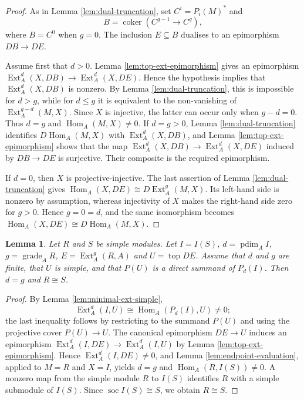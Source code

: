 \documentclass[a4paper]{amsart}
\newtheorem{lemma}[theorem]{Lemma}
\theoremstyle{definition}
\theoremstyle{remark}
\numberwithin{equation}{section}
\newcommand{\Ext}{\operatorname{Ext}}
\newcommand{\pdim}{\operatorname{pdim}}
\newcommand{\gr}{\operatorname{grade}}
\newcommand{\Hom}{\operatorname{Hom}}
\renewcommand{\top}{\operatorname{\mathrm{top}}}
\newcommand{\soc}{\operatorname{\mathrm{soc}}}
\begin{document}
\begin{proof}
As in Lemma \ref{lem:dual-truncation}, set $C^i=P_i(M)^{*}$ and \[
 B=\operatorname{coker}(C^{g-1}\longrightarrow C^g),
\]
where $B=C^0$ when $g=0$. The inclusion $E\subseteq B$ dualises to an epimorphism $DB\to DE$.

Assume first that $d>0$. Lemma \ref{lem:top-ext-epimorphism} gives an epimorphism
$\Ext_A^d(X,DB)\to\Ext_A^d(X,DE)$. Hence the hypothesis implies that $\Ext_A^d(X,DB)$ is nonzero. By Lemma \ref{lem:dual-truncation}, this is impossible for $d>g$, while for $d\leq g$ it is equivalent to the non-vanishing of $\Ext_A^{g-d}(M,X)$. Since $X$ is injective, the latter can occur only when $g-d=0$. Thus $d=g$ and $\Hom_A(M,X)\neq 0$. If $d=g>0$, Lemma \ref{lem:dual-truncation} identifies $D\Hom_A(M,X)$ with $\Ext_A^d(X,DB)$, and Lemma \ref{lem:top-ext-epimorphism} shows that the map $\Ext_A^d(X,DB)\to\Ext_A^d(X,DE)$ induced by $DB\to DE$ is surjective. Their composite is the required epimorphism.

If $d=0$, then $X$ is projective-injective. The last assertion of Lemma \ref{lem:dual-truncation} gives
$\Hom_A(X,DE)\cong D\Ext_A^g(M,X)$. Its left-hand side is nonzero by assumption, whereas injectivity of $X$ makes the right-hand side zero for $g>0$. Hence $g=0=d$, and the same isomorphism becomes $\Hom_A(X,DE)\cong D\Hom_A(M,X)$.
\end{proof}

\begin{lemma}\label{lem:corner}
Let $R$ and $S$ be simple modules. Let $I=I(S)$, $d=\pdim_A I$, $g=\gr_A R$, $E=\Ext_A^g(R,A)$ and $U=\top DE$. Assume that $d$ and $g$ are finite, that $U$ is simple, and that $P(U)$ is a direct summand of $P_d(I)$. Then $d=g$ and $R\cong S$.
\end{lemma}

\begin{proof}
By Lemma \ref{lem:minimal-ext-simple},
\[
 \Ext_A^d(I,U)\cong\Hom_A(P_d(I),U)\neq 0;
\]
the last inequality follows by restricting to the summand $P(U)$ and using the projective cover $P(U)\to U$. The canonical epimorphism $DE\to U$ induces an epimorphism
$\Ext_A^d(I,DE)\to\Ext_A^d(I,U)$ by Lemma \ref{lem:top-ext-epimorphism}. Hence $\Ext_A^d(I,DE)\neq 0$, and Lemma \ref{lem:endpoint-evaluation}, applied to $M=R$ and $X=I$, yields $d=g$ and $\Hom_A(R,I(S))\neq 0$. A nonzero map from the simple module $R$ to $I(S)$ identifies $R$ with a simple submodule of $I(S)$. Since $\soc I(S)\cong S$, we obtain $R\cong S$.
\end{proof}
\end{document}
